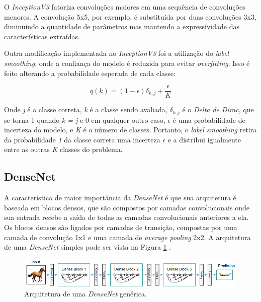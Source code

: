 O \textit{InceptionV3}\cite{inceptionv3} fatoriza convoluções maiores em uma sequência de convoluções menores. A convolução 5x5, por exemplo, é substituída por duas convoluções 3x3, diminuindo a quantidade de parâmetros mas mantendo a expressividade das características extraídas.

Outra modificação implementada no \textit{InceptionV3} foi a utilização do \textit{label smoothing}, onde a confiança do modelo é reduzida para evitar \textit{overfitting}. Isso é feito alterando a probabilidade esperada de cada classe:

\begin{equation}
    \label{eqn:labelsmoothing}
     q(k) = (1-\epsilon )\delta _{k,j}+\frac{\epsilon }{K}
\end{equation}

Onde \textit{j} é a classe correta, \textit{k} é a classe sendo avaliada, $\delta_{k,j}$ é o \textit{Delta de Dirac}, que se torna 1 quando \textit{k = j} e 0 em qualquer outro caso, $\epsilon$ é uma probabilidade de incerteza do modelo, e \textit{K} é o número de classes. Portanto, o \textit{label smoothing} retira da probabilidade \textit{1} da classe correta uma incerteza $\epsilon$ e a distribui igualmente entre as outras \textit{K} classes do problema.
\subsection{DenseNet}

A característica de maior importância da \textit{DenseNet}\cite{densenet} é que sua arquitetura é baseada em blocos densos, 
que são compostos por camadas convolucionais onde sua entrada recebe a saída de todas as camadas convolucionais anteriores a ela. 
Os blocos densos são ligados por camadas de transição, compostas por uma camada de convolução 1x1 e uma camada de \textit{average pooling} 2x2. 
A arquitetura de uma \textit{DenseNet} simples pode ser vista na Figura \ref{fig:densenet_arch} \cite{densenet}.

\begin{figure}[htb]
\centerline{\includegraphics[width=1\linewidth]{images/densenet.png}}
\caption{Arquitetura de uma \textit{DenseNet} genérica\cite{densenet}.}
\label{fig:densenet_arch}
\end{figure}


